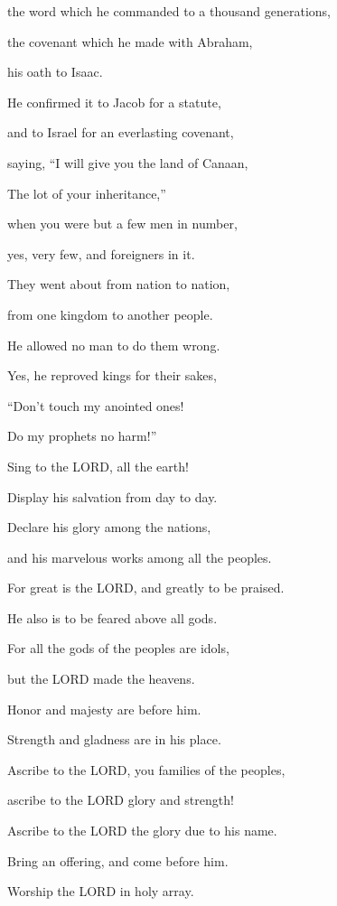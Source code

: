 the word which he commanded to a thousand generations,

\myverse{}the covenant which he made with Abraham,

his oath to Isaac.

\myverse{}He confirmed it to Jacob for a statute,

and to Israel for an everlasting covenant,

\myverse{}saying, “I will give you the land of Canaan,

The lot of your inheritance,”

\myverse{}when you were but a few men in number,

yes, very few, and foreigners in it.

\myverse{}They went about from nation to nation,

from one kingdom to another people.

\myverse{}He allowed no man to do them wrong.

Yes, he reproved kings for their sakes,

\myverse{}“Don’t touch my anointed ones!

Do my prophets no harm!”


\vspace{\baselineskip} \myverse{}Sing to the LORD, all the earth!

Display his salvation from day to day.

\myverse{}Declare his glory among the nations,

and his marvelous works among all the peoples.

\myverse{}For great is the LORD, and greatly to be praised.

He also is to be feared above all gods.

\myverse{}For all the gods of the peoples are idols,

but the LORD made the heavens.

\myverse{}Honor and majesty are before him.

Strength and gladness are in his place.


\vspace{\baselineskip} \myverse{}Ascribe to the LORD, you families of the peoples,

ascribe to the LORD glory and strength!

\myverse{}Ascribe to the LORD the glory due to his name.

Bring an offering, and come before him.

Worship the LORD in holy array.

